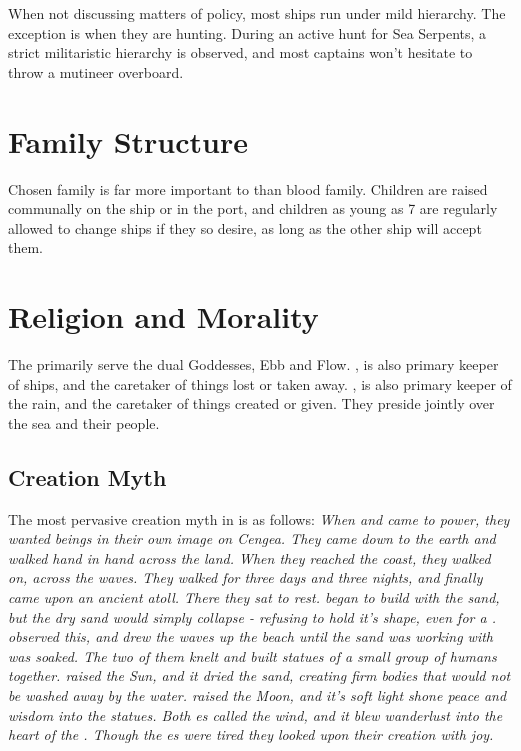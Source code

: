 \documentclass[blue]{GL2020}
\begin{document}
\begin{enumerate}
\end{enumerate}

When not discussing matters of policy, most ships run under mild hierarchy. The exception is when they are hunting. During an active hunt for Sea Serpents, a strict militaristic hierarchy is observed, and most captains won't hesitate to throw a mutineer overboard.

\section*{Family Structure}
Chosen family is far more important to \pShippies{} than blood family. Children are raised communally on the ship or in the port, and children as young as 7 are regularly allowed to change ships if they so desire, as long as the other ship will accept them.

\section*{Religion and Morality}
The \pShippies{} primarily serve the dual Goddesses, Ebb and Flow. \cEbbFull{\MYname}, is also primary keeper of ships, and the caretaker of things lost or taken away. \cFlowFull{\MYname}, is also primary keeper of the rain, and the caretaker of things created or given. They preside jointly over the sea and their people.

\subsection*{Creation Myth}
The most pervasive creation myth in \pShip{} is as follows:
\emph{When \cEbb{} and \cFlow{} came to power, they wanted beings in their own image on Cengea. They came down to the earth and walked hand in hand across the land. When they reached the coast, they walked on, across the waves. They walked for three days and three nights, and finally came upon an ancient atoll. There they sat to rest. \cFlow{} began to build with the sand, but the dry sand would simply collapse - refusing to hold it's shape, even for a . \cEbb{} observed this, and drew the waves up the beach until the sand \cFlow{} was working with was soaked. The two of them knelt and built statues of a small group of humans together. \cFlow{} raised the Sun, and it dried the sand, creating firm bodies that would not be washed away by the water. \cEbb{} raised the Moon, and it's soft light shone peace and wisdom into the statues. Both \cEbb{\God}es called the wind, and it blew wanderlust into the heart of the \pShippies{}. Though the \cEbb{\God}es were tired they looked upon their creation with joy.}
\end{document}
